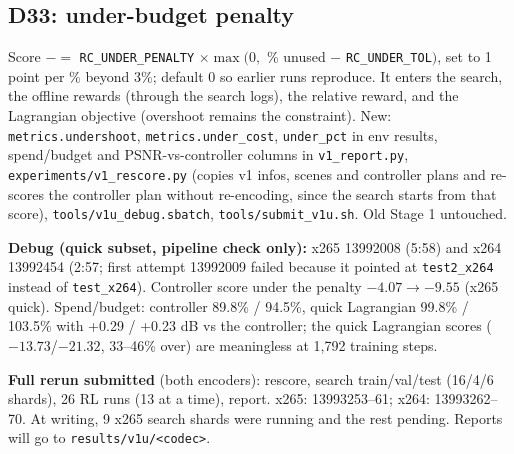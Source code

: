 \documentclass[10pt,a4paper]{article}
\newcommand{\code}[1]{\texttt{\small #1}}
\begin{document}
\subsection{D33: under-budget penalty}
Score $-=$ \code{RC\_UNDER\_PENALTY} $\times\max(0,$ \% unused $-$ \code{RC\_UNDER\_TOL}$)$, set to 1 point per \% beyond
3\%; default 0 so earlier runs reproduce. It enters the search, the offline rewards (through the search logs), the
relative reward, and the Lagrangian objective (overshoot remains the constraint). New: \code{metrics.undershoot},
\code{metrics.under\_cost}, \code{under\_pct} in env results, spend/budget and PSNR-vs-controller columns in
\code{v1\_report.py}, \code{experiments/v1\_rescore.py} (copies v1 infos, scenes and controller plans and re-scores the
controller plan without re-encoding, since the search starts from that score), \code{tools/v1u\_debug.sbatch},
\code{tools/submit\_v1u.sh}. Old Stage 1 untouched.

\textbf{Debug (quick subset, pipeline check only):} x265 13992008 (5:58) and x264 13992454 (2:57; first attempt
13992009 failed because it pointed at \code{test2\_x264} instead of \code{test\_x264}). Controller score under the
penalty $-4.07\to-9.55$ (x265 quick). Spend/budget: controller 89.8\% / 94.5\%, quick Lagrangian 99.8\% / 103.5\% with
+0.29 / +0.23 dB vs the controller; the quick Lagrangian scores ($-13.73$/$-21.32$, 33--46\% over) are meaningless at
1,792 training steps.

\textbf{Full rerun submitted} (both encoders): rescore, search train/val/test (16/4/6 shards), 26 RL runs (13 at a
time), report. x265: 13993253--61; x264: 13993262--70. At writing, 9 x265 search shards were running and the rest
pending. Reports will go to \code{results/v1u/<codec>}.
\end{document}
